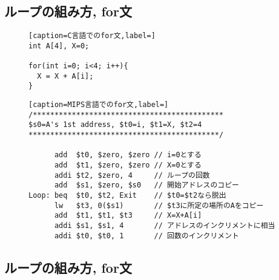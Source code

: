 \documentclass[a4paper, xelatex, ja=standard]{bxjsarticle}
\begin{document}
\subsection{ループの組み方, for文}

\begin{figure}[h]
\centering
\begin{minipage}[t]{0.3\linewidth}
\begin{lstlisting}[caption=C言語でのfor文,label=]
int A[4], X=0;

for(int i=0; i<4; i++){
  X = X + A[i];
}
\end{lstlisting}
\end{minipage}
\hspace{15pt}
\begin{minipage}[t]{0.5\linewidth}
\begin{lstlisting}[caption=MIPS言語でのfor文,label=]
/********************************************
$s0=A's 1st address, $t0=i, $t1=X, $t2=4
********************************************/

      add  $t0, $zero, $zero // i=0とする
      add  $t1, $zero, $zero // X=0とする
      addi $t2, $zero, 4     // ループの回数
      add  $s1, $zero, $s0   // 開始アドレスのコピー
Loop: beq  $t0, $t2, Exit    // $t0=$t2なら脱出
      lw   $t3, 0($s1)       // $t3に所定の場所のAをコピー
      add  $t1, $t1, $t3     // X=X+A[i] 
      addi $s1, $s1, 4       // アドレスのインクリメントに相当
      addi $t0, $t0, 1       // 回数のインクリメント
\end{lstlisting}
\end{minipage}
\label{}
\end{figure}

\subsection{ループの組み方, for文}
\end{document}

